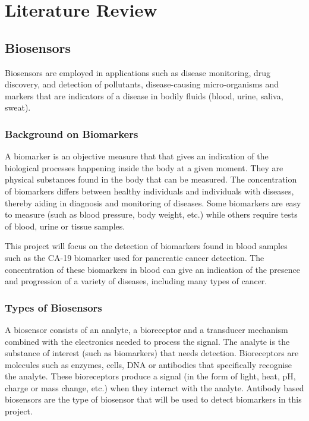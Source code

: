 \graphicspath{{literature_review/fig/}}

\chapter{Literature Review}
\section{Biosensors}
Biosensors are employed in applications such as disease monitoring, drug discovery, and detection of pollutants, disease-causing micro-organisms and markers that are indicators of a disease in bodily fluids (blood, urine, saliva, sweat).\cite{bhallaIntroductionBiosensors2016} 
\subsection{Background on Biomarkers}
A biomarker is an objective measure that that gives an indication of the biological processes happening inside the body at a given moment.\cite{BiomarkersNationalInstitute} They are physical substances found in the body that can be measured. The concentration of biomarkers differs between healthy individuals and individuals with diseases, thereby aiding in diagnosis and monitoring of diseases.\cite{rosenzweigWhatArePancreatic2018} Some biomarkers are easy to measure (such as blood pressure, body weight, etc.) while others require tests of blood, urine or tissue samples.\cite{BiomarkersNationalInstitute} 

This project will focus on the detection of biomarkers found in blood samples such as the CA-19 biomarker used for pancreatic cancer detection.  The concentration of these biomarkers in blood can give an indication of the presence and progression of a variety of diseases, including many types of cancer.\cite{ribeiroApplicationsElectrochemicalImpedance2024}

\subsection{Types of Biosensors}
A biosensor consists of an analyte, a bioreceptor and a transducer mechanism combined with the electronics needed to process the signal.\cite{bhallaIntroductionBiosensors2016} The analyte is the substance of interest (such as biomarkers) that needs detection. Bioreceptors are molecules such as enzymes, cells, DNA or antibodies that specifically recognise the analyte. These bioreceptors produce a signal (in the form of light, heat, pH, charge or mass change, etc.) when they interact with the analyte.\cite{bhallaIntroductionBiosensors2016} Antibody based biosensors are the type of biosensor that will be used to detect biomarkers in this project.

